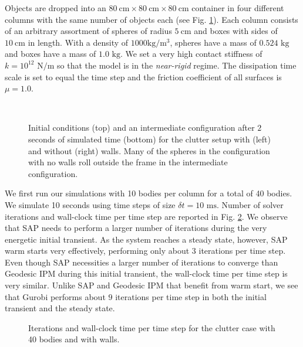 Objects are dropped into an $80~\text{cm}\times80~\text{cm}\times80~\text{cm}$
container in four different columns with the same number of objects each (see
Fig. \ref{fig:clutter_snapshots}). Each column consists of an arbitrary
assortment of spheres of radius $5~\text{cm}$ and boxes with sides of
$10~\text{cm}$ in length. With a density of $1000\text{kg}/\text{m}^3$, spheres
have a mass of $0.524\text{ kg}$ and boxes have a mass of $1.0\text{ kg}$. We
set a very high contact stiffness of $k=10^{12}\text{ N}/\text{m}$ so that the
model is in the \emph{near-rigid} regime. The dissipation time scale is set to
equal the time step and the friction coefficient of all surfaces is $\mu=1.0$.
\begin{figure}[t]
    \centering
    \\
    \vspace{0.1cm}
    \caption{Initial conditions (top) and an intermediate configuration after
    $2$ seconds of simulated time (bottom) for the clutter setup with (left) and
    without (right) walls. Many of the spheres in the configuration with no
    walls roll outside the frame in the intermediate configuration.}
    \label{fig:clutter_snapshots}
\end{figure}

We first run our simulations with 10 bodies per column for a total of 40 bodies.
We simulate 10 seconds using time steps of size $\delta t = 10\text{ ms}$.
Number of solver iterations and wall-clock time per time step are reported in
Fig. \ref{fig:clutter_w_walls_nb40}. We observe that SAP needs to perform a
larger number of iterations during the very energetic initial transient. As the
system reaches a steady state, however, SAP warm starts very effectively,
performing only about $3$ iterations per time step. Even though SAP necessities
a larger number of iterations to converge than Geodesic IPM during this initial
transient, the wall-clock time per time step is very similar. Unlike SAP and
Geodesic IPM that benefit from warm start, we see that Gurobi performs about $9$
iterations per time step in both the initial transient and the steady state.
\begin{figure}[!h]
	\centering
	\caption{\label{fig:clutter_w_walls_nb40} 
	Iterations and wall-clock time per time step for the clutter case with 40
	bodies and with walls.}
\end{figure}

